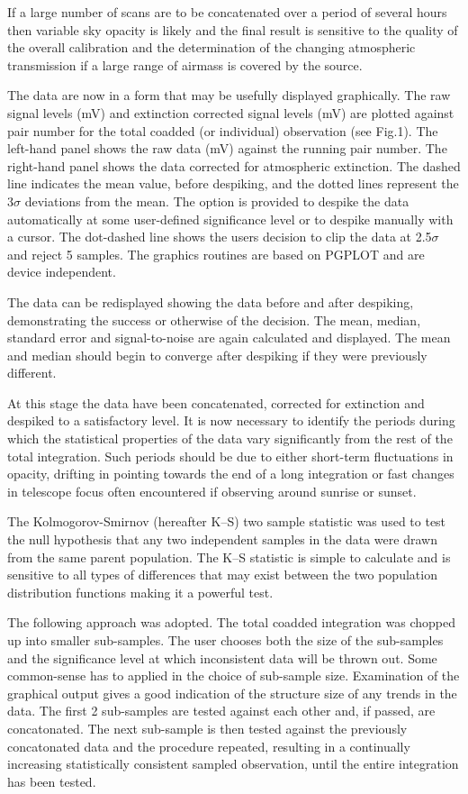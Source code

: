 If a large number of scans are to be concatenated over a period of several
hours then variable sky opacity is likely and the final result is sensitive
to the quality of the overall calibration and the determination of the
changing atmospheric transmission if a large range of airmass is covered by
the source.

 The data are now in a form that may be usefully displayed
graphically. The raw signal levels (mV) and extinction corrected signal levels
(mV) are plotted against pair number for the total coadded (or individual)
observation (see Fig.1). The left-hand panel shows the raw data (mV) against the running
pair number. The right-hand panel shows the data corrected for
atmospheric extinction. The dashed line indicates the mean value, before
despiking, and the dotted lines represent the 3$\sigma$ deviations from the
mean.
The option is provided to despike the data automatically at some user-defined
significance level or to despike manually with a cursor.
The dot-dashed line shows the users decision to clip the data at
2.5$\sigma$ and reject 5 samples.
The graphics routines are based on PGPLOT and are device independent.


The data can be redisplayed showing the data before and after despiking,
demonstrating the success or otherwise of the decision. The
mean, median, standard error and signal-to-noise are again calculated and
displayed.  The mean and median should begin to converge after despiking if
they were previously different.

 At this stage the data have been concatenated,
corrected for extinction
and despiked to a satisfactory level. It is now necessary to identify the
periods during which the statistical properties of the data vary significantly
from the rest of the total integration. Such periods should be due to either
short-term fluctuations in opacity, drifting in pointing towards the end of
a long integration or fast changes in telescope focus often encountered if
observing around sunrise or sunset.

The Kolmogorov-Smirnov (hereafter K--S) two sample statistic was used  to test
the null hypothesis that any two independent samples in the data were drawn from
the same parent population. The K--S statistic is simple to calculate and
is sensitive to all types of differences that may exist between the two
population distribution functions making it a powerful test.

The following approach was adopted.
The total coadded integration was chopped up into smaller sub-samples. The user
chooses both the size of the sub-samples and the significance level at which
inconsistent data will be thrown out. Some common-sense has to applied in the
choice of sub-sample size. Examination of the graphical output gives a good
indication of the structure size of any trends in the data.
The first 2 sub-samples are tested against each other and, if passed, are
concatonated. The next sub-sample is then tested against the previously
concatonated data and the procedure repeated, resulting in a continually
increasing statistically consistent sampled observation, until the entire
integration has been tested.

